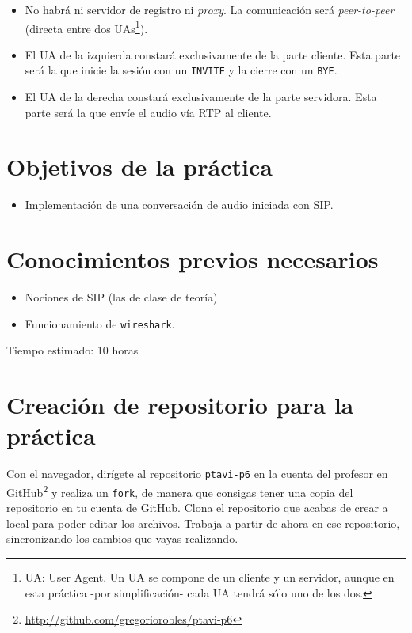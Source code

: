 \documentclass[a4paper,11pt]{article}
\begin{document}
\begin{itemize}
  \item No habrá ni servidor de registro ni \emph{proxy}. La comunicación será \emph{peer-to-peer} (directa entre dos UAs\footnote{UA: User Agent. Un UA se compone de un cliente y un servidor, aunque en esta práctica -por simplificación- cada UA tendrá sólo uno de los dos.}).
  \item El UA de la izquierda constará exclusivamente de la parte cliente. Esta parte será la que inicie la sesión con un \texttt{INVITE} y la cierre con un \texttt{BYE}.
  \item El UA de la derecha constará exclusivamente de la parte servidora. Esta parte será la que envíe el audio vía RTP al cliente.
\end{itemize}


\section*{Objetivos de la práctica}

\begin{itemize}
  \item Implementación de una conversación de audio iniciada con SIP.
\end{itemize}

\section*{Conocimientos previos necesarios}

\begin{itemize}
  \item Nociones de SIP (las de clase de teoría)
  \item Funcionamiento de \texttt{wireshark}.
\end{itemize}

Tiempo estimado: 10 horas

\section*{Creación de repositorio para la práctica}

 Con el navegador, dirígete al repositorio \texttt{ptavi-p6} en la cuenta del profesor en GitHub\footnote{\url{http://github.com/gregoriorobles/ptavi-p6}} y realiza un \texttt{fork}, de manera que consigas tener una copia del repositorio en tu cuenta de GitHub. Clona el repositorio que acabas de crear a local para poder editar los archivos. Trabaja a partir de ahora en ese repositorio, sincronizando los cambios que vayas realizando.
\end{document}
